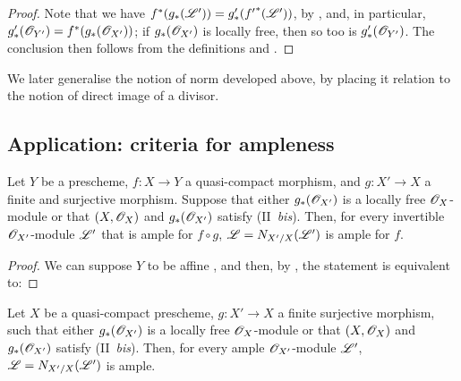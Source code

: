 \begin{proof}
Note that we have $f^*(g_*(\mathscr{L}'))=g'_*({f'}^*(\mathscr{L}'))$, by , and, in particular, $g'_*(\mathscr{O}_{Y'})=f^*(g_*(\mathscr{O}_{X'}))$;
if $g_*(\mathscr{O}_{X'})$ is locally free, then so too is $g'_*(\mathscr{O}_{Y'})$.
The conclusion then follows from the definitions and .
\end{proof}

\begin{remark}[6.5.9]
\label{II.6.5.9}
We later generalise the notion of norm developed above, by placing it relation to the notion of direct image of a divisor.
\end{remark}


\subsection{Application: criteria for ampleness}
\label{subsection:II.6.6}

\begin{proposition}[6.6.1]
\label{II.6.6.1}
Let $Y$ be a prescheme, $f:X\to Y$ a quasi-compact morphism, and $g:X'\to X$ a finite and surjective morphism.
Suppose that either $g_*(\mathscr{O}_{X'})$ is a locally free $\mathscr{O}_X$-module or that $(X,\mathscr{O}_X)$ and $g_*(\mathscr{O}_{X'})$ satisfy (II~\emph{bis}).
Then, for every invertible $\mathscr{O}_{X'}$-module $\mathscr{L}'$ that is ample for $f\circ g$, $\mathscr{L}=N_{X'/X}(\mathscr{L}')$ is ample for $f$.
\end{proposition}

\begin{proof}
We can suppose $Y$ to be affine , and then, by , the statement is equivalent to:
\end{proof}

\begin{corollary}[6.6.2]
\label{II.6.6.2}
Let $X$ be a quasi-compact prescheme, $g:X'\to X$ a finite surjective morphism, such that either $g_*(\mathscr{O}_{X'})$ is a locally free $\mathscr{O}_X$-module or that $(X,\mathscr{O}_X)$ and $g_*(\mathscr{O}_{X'})$ satisfy (II~\emph{bis}).
Then, for every ample $\mathscr{O}_{X'}$-module $\mathscr{L}'$, $\mathscr{L}=N_{X'/X}(\mathscr{L}')$ is ample.
\end{corollary}


